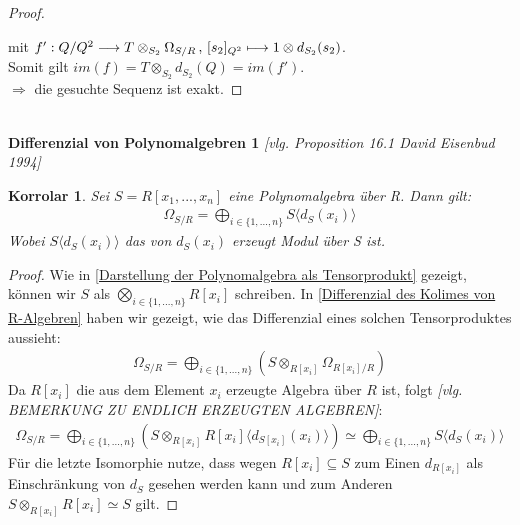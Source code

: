 \documentclass[10pt,a4paper]{report}
\newcommand{\ModulsOfDifferenzials}{David Eisenbud 1994}
\newcounter{Aussage}[chapter]
\newtheorem{korrolar}[Aussage]{Korrolar}
\newcommand{\function}[5]{\nolinebreak{#1:#2 \longrightarrow #3 \, , \, #4 \longmapsto #5}}
\newcommand{\divR}[2]{\Omega_{#1/#2}}
\newcommand{\divf}[1]{d_{#1}}
\newcommand{\Tensor}[3]{#1 \otimes_{#2} #3}
\newcommand{\tensor}[3]{#1 \otimes #3}
\newcommand{\immage}[1]{im(#1)}
\begin{document}
\begin{proof}
\begin{center}
\end{center}
mit $\function{f'}{Q/Q^2}{{\Tensor{T}{S_2}{\divR{S}{R}}}}{[s_2]_{Q^2}}{\tensor{1}{S_2}{\divf{S_2}(s_2)}}$.\\
Somit gilt $\immage{f} = \Tensor{T}{S_2}{\divf{S_2}(Q)} = \immage{f'}$.\\
$\Rightarrow$ die gesuchte Sequenz ist exakt.
\end{proof}


\ \\
\textbf{Differenzial von Polynomalgebren 1} \textit{[vlg. Proposition 16.1 \ModulsOfDifferenzials]}
\begin{korrolar}\label{Differenzial von Polynomalgebren 1}
Sei $S = R[x_1,...,x_n]$ eine Polynomalgebra über R. Dann gilt:
\begin{gather*}
\divR{S}{R} = \bigoplus_{i \in \lbrace 1,...,n \rbrace} S \langle \divf{S}(x_i) \rangle 
\end{gather*}
Wobei $S\langle \divf{S}(x_i)\rangle$ das von $\divf{S}(x_i)$ erzeugt Modul über S ist.
\end{korrolar}
\begin{proof}
Wie in \cref{Darstellung der Polynomalgebra als Tensorprodukt} gezeigt, können wir $S$ als $\bigotimes_{i \in \lbrace 1,...,n \rbrace} R[x_i]$ schreiben. In \cref{Differenzial des Kolimes von R-Algebren} haben wir gezeigt, wie das Differenzial eines solchen Tensorproduktes aussieht:
\begin{gather*}
\divR{S}{R} = \bigoplus_{i \in \lbrace 1,...,n \rbrace} (\Tensor{S}{R[x_i]}{\divR{R[x_i]}{R}})
\end{gather*}
Da $R[x_i]$ die aus dem Element $x_i$ erzeugte Algebra über $R$ ist, folgt \textit{[vlg. BEMERKUNG ZU ENDLICH ERZEUGTEN ALGEBREN]}: 
\begin{gather*}
\divR{S}{R} = \bigoplus_{i \in \lbrace 1,...,n \rbrace} (\Tensor{S}{R[x_i]}{R[x_i]\langle \divf{S[x_i]}(x_i) \rangle})
\simeq \bigoplus_{i \in \lbrace 1,...,n \rbrace} S \langle \divf{S}(x_i) \rangle 
\end{gather*}
Für die letzte Isomorphie nutze, dass wegen $R[x_i] \subseteq S$ zum Einen $\divf{R[x_i]}$ als Einschränkung von $\divf{S}$ gesehen werden kann und zum Anderen $\Tensor{S}{R[x_i]}{R[x_i]} \simeq S$ gilt.
\end{proof}
\end{document}
